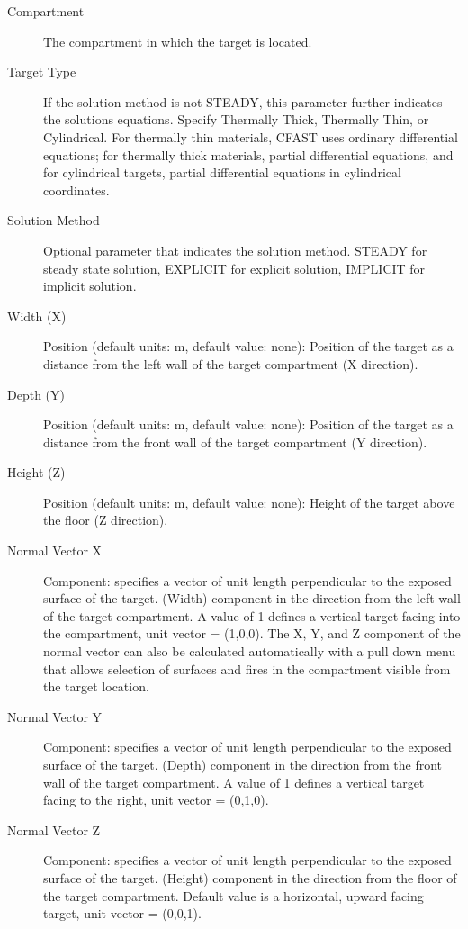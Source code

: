 \begin{description}
\item[Compartment] The compartment in which the target is located.

\item[Target Type] If the solution method is not STEADY, this parameter further indicates the solutions equations.  Specify Thermally Thick, Thermally Thin, or Cylindrical.  For thermally thin materials, CFAST uses ordinary differential equations; for thermally thick materials, partial differential equations, and for cylindrical targets, partial differential equations in cylindrical coordinates.

\item[Solution Method] Optional parameter that indicates the solution method. STEADY for steady state solution, EXPLICIT for explicit solution, IMPLICIT for implicit solution.

\item[Width (X)] Position (default units: m, default value: none): Position of the target as a distance from the left wall of the target compartment (X direction).

\item[Depth (Y)] Position (default units: m, default value: none): Position of the target as a distance from the front wall of the target compartment (Y direction).

\item[Height (Z)] Position (default units: m, default value: none): Height of the target above the floor (Z direction).

\item[Normal Vector X] Component: specifies a vector of unit length perpendicular to the exposed surface of the target. (Width) component in the direction from the left wall of the target compartment. A value of 1 defines a vertical target facing into the compartment, unit vector = (1,0,0). The X, Y, and Z component of the normal vector can also be calculated automatically with a pull down menu that allows selection of surfaces and fires in the compartment visible from the target location.

\item[Normal Vector Y] Component: specifies a vector of unit length perpendicular to the exposed surface of the target. (Depth) component in the direction from the front wall of the target compartment. A value of 1 defines a vertical target facing to the right, unit vector = (0,1,0).

\item[Normal Vector Z] Component: specifies a vector of unit length perpendicular to the exposed surface of the target. (Height) component in the direction from the floor of the target compartment. Default value is a horizontal, upward facing target, unit vector = (0,0,1).


\end{description}
